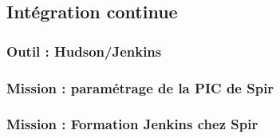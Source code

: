 \subsection{Intégration continue}

\subsubsection{Outil : Hudson/Jenkins}

\subsubsection{Mission : paramétrage de la PIC de Spir}

\subsubsection{Mission : Formation Jenkins chez Spir}

